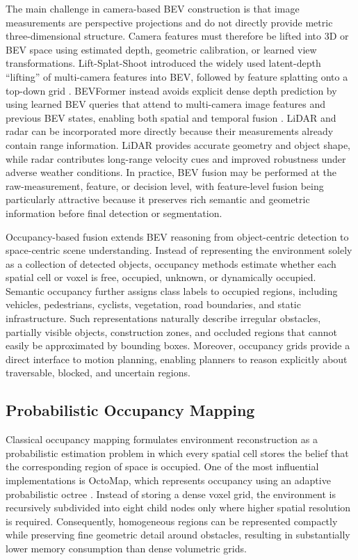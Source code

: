 \documentclass[11pt,oneside,openany]{book}
\begin{document}
The main challenge in camera-based BEV construction is that image measurements are perspective projections and do not directly provide metric three-dimensional structure. Camera features must therefore be lifted into 3D or BEV space using estimated depth, geometric calibration, or learned view transformations. Lift-Splat-Shoot introduced the widely used latent-depth ``lifting'' of multi-camera features into BEV, followed by feature splatting onto a top-down grid \cite{philion2020_lss}. BEVFormer instead avoids explicit dense depth prediction by using learned BEV queries that attend to multi-camera image features and previous BEV states, enabling both spatial and temporal fusion \cite{li2022_bevformer}. LiDAR and radar can be incorporated more directly because their measurements already contain range information. LiDAR provides accurate geometry and object shape, while radar contributes long-range velocity cues and improved robustness under adverse weather conditions. In practice, BEV fusion may be performed at the raw-measurement, feature, or decision level, with feature-level fusion being particularly attractive because it preserves rich semantic and geometric information before final detection or segmentation.

Occupancy-based fusion extends BEV reasoning from object-centric detection to space-centric scene understanding. Instead of representing the environment solely as a collection of detected objects, occupancy methods estimate whether each spatial cell or voxel is free, occupied, unknown, or dynamically occupied. Semantic occupancy further assigns class labels to occupied regions, including vehicles, pedestrians, cyclists, vegetation, road boundaries, and static infrastructure. Such representations naturally describe irregular obstacles, partially visible objects, construction zones, and occluded regions that cannot easily be approximated by bounding boxes. Moreover, occupancy grids provide a direct interface to motion planning, enabling planners to reason explicitly about traversable, blocked, and uncertain regions.

\subsection{Probabilistic Occupancy Mapping}

Classical occupancy mapping formulates environment reconstruction as a probabilistic estimation problem in which every spatial cell stores the belief that the corresponding region of space is occupied. One of the most influential implementations is OctoMap, which represents occupancy using an adaptive probabilistic octree \cite{hornung2013_octomap}. Instead of storing a dense voxel grid, the environment is recursively subdivided into eight child nodes only where higher spatial resolution is required. Consequently, homogeneous regions can be represented compactly while preserving fine geometric detail around obstacles, resulting in substantially lower memory consumption than dense volumetric grids.
\end{document}
